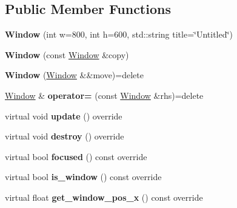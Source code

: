 \subsection*{Public Member Functions}
\begin{DoxyCompactItemize}
\item 
\mbox{\label{class_window_a0799cc50a89cc6d5e1cd98e71791200d}} 
{\bfseries Window} (int w=800, int h=600, std\+::string title=\char`\"{}Untitled\char`\"{})
\item 
\mbox{\label{class_window_a8ffc0093a40fa9c91f060818444ce4a1}} 
{\bfseries Window} (const \mbox{\hyperlink{class_window}{Window}} \&copy)
\item 
\mbox{\label{class_window_aa4086debceb557ecb6443cce32b41f9b}} 
{\bfseries Window} (\mbox{\hyperlink{class_window}{Window}} \&\&move)=delete
\item 
\mbox{\label{class_window_a96e2d69af0539f4a45c04cf54803f5ec}} 
\mbox{\hyperlink{class_window}{Window}} \& {\bfseries operator=} (const \mbox{\hyperlink{class_window}{Window}} \&rhs)=delete
\item 
\mbox{\label{class_window_aa63a9a2404cebe562174a851f2dc8a01}} 
virtual void {\bfseries update} () override
\item 
\mbox{\label{class_window_ac11084e8bd2b61ba1a45266a9a4a0b57}} 
virtual void {\bfseries destroy} () override
\item 
\mbox{\label{class_window_af79c5fde03ed3825e0459a267ea01dee}} 
virtual bool {\bfseries focused} () const override
\item 
\mbox{\label{class_window_a43a34a3321d0a9bd30dbba747af14c6a}} 
virtual bool {\bfseries is\+\_\+window} () const override
\item 
\mbox{\label{class_window_ab2af2ee909ac87876fd043acfe7611ca}} 
virtual float {\bfseries get\+\_\+window\+\_\+pos\+\_\+x} () const override
\item 
\mbox{\label{class_window_a950ef0cfbccf484315041162942c4ecc}} 

\end{DoxyCompactItemize}
